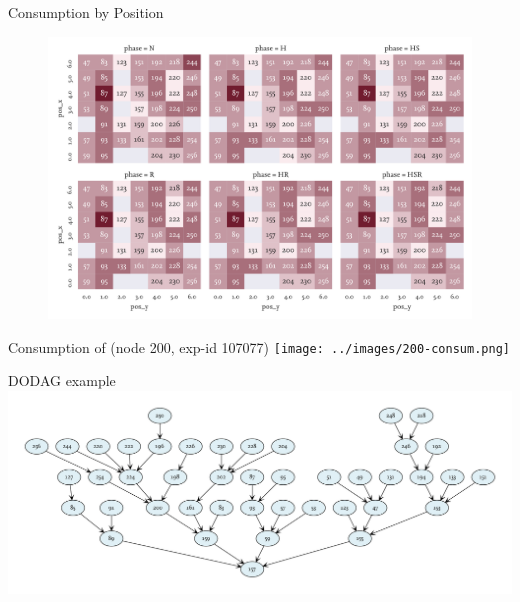 \documentclass[fleqn,11pt,aspectratio=1610]{beamer}
\begin{document}
\begin{frame}{Consumption by Position}
  \begin{figure}
    \centering
    \includegraphics[height=.9\textheight]{../images/consumption-nodes.pdf}
  \end{figure}
\end{frame}

\begin{frame}{Consumption of (node 200, exp-id 107077)}
  \centering
  \texttt{[image: ../images/200-consum.png]}
\end{frame}

\begin{frame}{DODAG example}
  \centering
  \includegraphics[width=\textwidth]{../images/dag.pdf}
\end{frame}
\end{document}

